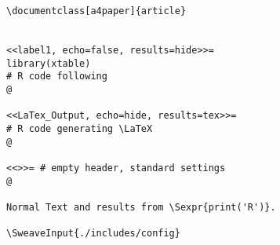 \begin{lstlisting}
\documentclass[a4paper]{article}


<<label1, echo=false, results=hide>>=
library(xtable)
# R code following
@

<<LaTex_Output, echo=hide, results=tex>>=
# R code generating \LaTeX
@

<<>>= # empty header, standard settings
@

Normal Text and results from \Sexpr{print('R')}.

\SweaveInput{./includes/config}


\end{lstlisting} 
